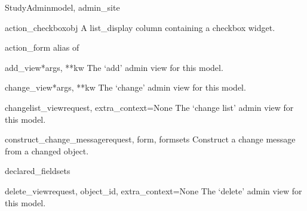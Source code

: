 \documentclass[letterpaper,10pt,english]{sphinxmanual}
\begin{document}
\hypertarget{data.admin.StudyAdmin}{}\begin{classdesc}{StudyAdmin}{model, admin\_site}~

\hypertarget{data.admin.StudyAdmin.action_checkbox}{}\begin{methoddesc}{action\_checkbox}{obj}
A list\_display column containing a checkbox widget.
\end{methoddesc}

\hypertarget{data.admin.StudyAdmin.action_form}{}\begin{memberdesc}{action\_form}
alias of 
\end{memberdesc}

\hypertarget{data.admin.StudyAdmin.add_view}{}\begin{methoddesc}{add\_view}{*args, **kw}
The `add' admin view for this model.
\end{methoddesc}

\hypertarget{data.admin.StudyAdmin.change_view}{}\begin{methoddesc}{change\_view}{*args, **kw}
The `change' admin view for this model.
\end{methoddesc}

\hypertarget{data.admin.StudyAdmin.changelist_view}{}\begin{methoddesc}{changelist\_view}{request, extra\_context=None}
The `change list' admin view for this model.
\end{methoddesc}

\hypertarget{data.admin.StudyAdmin.construct_change_message}{}\begin{methoddesc}{construct\_change\_message}{request, form, formsets}
Construct a change message from a changed object.
\end{methoddesc}

\hypertarget{data.admin.StudyAdmin.declared_fieldsets}{}\begin{memberdesc}{declared\_fieldsets}\end{memberdesc}

\hypertarget{data.admin.StudyAdmin.delete_view}{}\begin{methoddesc}{delete\_view}{request, object\_id, extra\_context=None}
The `delete' admin view for this model.
\end{methoddesc}


\end{classdesc}
\end{document}
